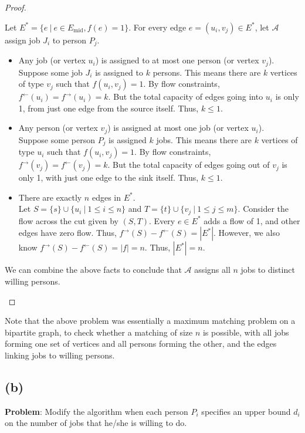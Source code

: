 \documentclass[11pt, fleqn]{article}
\begin{document}
\begin{proof}
\begin{itemize}
    Let $E^* = \{e\ |\ e\in E_{\text{mid}}, f(e)=1\}$. For every edge $e=(u_i,v_j)\in E^*$, let $\mathcal{A}$ assign job $J_i$ to person $P_j$.
    \begin{itemize}
        \item Any job (or vertex $u_i$) is assigned to at most one person (or vertex $v_j$).\\
        Suppose some job $J_i$ is assigned to $k$ persons. This means there are $k$ vertices of type $v_j$ such that $f(u_i,v_j)=1$. By flow constraints, $f^{\leftarrow}(u_i) = f^{\rightarrow}(u_i) = k$. But the total capacity of edges going into $u_i$ is only 1, from just one edge from the source itself. Thus, $k\leq 1$.
        \item Any person (or vertex $v_j$) is assigned at most one job (or vertex $u_i$).\\
        Suppose some person $P_j$ is assigned $k$ jobs. This means there are $k$ vertices of type $u_i$ such that $f(u_i,v_j)=1$. By flow constraints, $f^{\rightarrow}(v_j) = f^{\leftarrow}(v_j) = k$. But the total capacity of edges going out of $v_j$ is only 1, with just one edge to the sink itself. Thus, $k\leq 1$.
        \item There are exactly $n$ edges in $E^*$.\\
        Let $S = \{s\}\cup\{u_i\ |\ 1\leq i\leq n\}$ and $T = \{t\}\cup\{v_j\ |\ 1\leq j\leq m\}$. Consider the flow across the cut given by $(S,T)$. Every $e\in E^*$ adds a flow of 1, and other edges have zero flow. Thus, $f^{\rightarrow}(S)-f^{\leftarrow}(S) = |E^*|$. However, we also know $f^{\rightarrow}(S)-f^{\leftarrow}(S) = |f| = n$. Thus, $|E^*|=n$.
    \end{itemize}
    We can combine the above facts to conclude that $\mathcal{A}$ assigns all $n$ jobs to distinct willing persons.
\end{itemize}
\end{proof}

Note that the above problem was essentially a maximum matching problem on a bipartite graph, to check whether a matching of size $n$ is possible, with all jobs forming one set of vertices and all persons forming the other, and the edges linking jobs to willing persons.

\newpage

\subsection*{(b)}

\textbf{Problem}: Modify the algorithm when each person $P_i$ specifies an upper bound $d_i$ on the number of jobs that he/she is willing to do.
\end{document}
